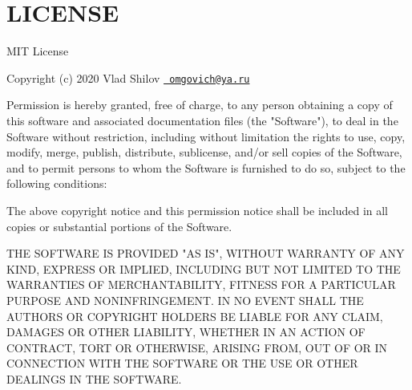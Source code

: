 \chapter{LICENSE}
\hypertarget{md_pkiclassroomrescheduler_2src_2main_2frontend_2node__modules_2colord_2_l_i_c_e_n_s_e}{}\label{md_pkiclassroomrescheduler_2src_2main_2frontend_2node__modules_2colord_2_l_i_c_e_n_s_e}
MIT License

Copyright (c) 2020 Vlad Shilov \href{mailto:omgovich@ya.ru}{\texttt{ omgovich@ya.\+ru}}

Permission is hereby granted, free of charge, to any person obtaining a copy of this software and associated documentation files (the "{}\+Software"{}), to deal in the Software without restriction, including without limitation the rights to use, copy, modify, merge, publish, distribute, sublicense, and/or sell copies of the Software, and to permit persons to whom the Software is furnished to do so, subject to the following conditions\+:

The above copyright notice and this permission notice shall be included in all copies or substantial portions of the Software.

THE SOFTWARE IS PROVIDED "{}\+AS IS"{}, WITHOUT WARRANTY OF ANY KIND, EXPRESS OR IMPLIED, INCLUDING BUT NOT LIMITED TO THE WARRANTIES OF MERCHANTABILITY, FITNESS FOR A PARTICULAR PURPOSE AND NONINFRINGEMENT. IN NO EVENT SHALL THE AUTHORS OR COPYRIGHT HOLDERS BE LIABLE FOR ANY CLAIM, DAMAGES OR OTHER LIABILITY, WHETHER IN AN ACTION OF CONTRACT, TORT OR OTHERWISE, ARISING FROM, OUT OF OR IN CONNECTION WITH THE SOFTWARE OR THE USE OR OTHER DEALINGS IN THE SOFTWARE. 